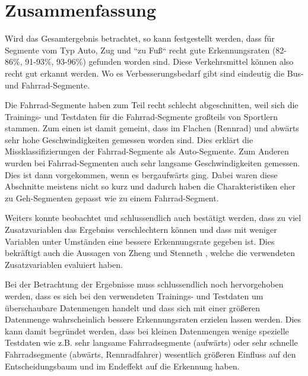 \section{Zusammenfassung}
Wird das Gesamtergebnis betrachtet, so kann festgestellt werden, dass für Segmente vom Typ Auto, Zug und ``zu Fuß`` recht gute Erkennungsraten (82-86\%, 91-93\%, 93-96\%) gefunden worden sind. Diese Verkehrsmittel können also recht gut erkannt werden. Wo es Verbesserungsbedarf gibt sind eindeutig die Bus- und Fahrrad-Segmente.  

Die Fahrrad-Segmente haben zum Teil recht schlecht abgeschnitten, weil sich die Trainings- und Testdaten für die Fahrrad-Segmente großteils von Sportlern stammen. Zum einen ist damit gemeint, dass im Flachen (Rennrad) und abwärts sehr hohe Geschwindigkeiten gemessen worden sind. Dies erklärt die Missklassifizierungen der Fahrrad-Segmente als Auto-Segmente. Zum Anderen wurden bei Fahrrad-Segmenten auch sehr langsame Geschwindigkeiten gemessen. Dies ist dann vorgekommen, wenn es bergaufwärts ging. Dabei waren diese Abschnitte meistens nicht so kurz und dadurch haben die Charakteristiken eher zu Geh-Segmenten gepasst wie zu einem Fahrrad-Segment.

Weiters konnte beobachtet und schlussendlich auch bestätigt werden, dass zu viel Zusatzvariablen das Ergebniss verschlechtern können und dass mit weniger Variablen unter Umständen eine bessere Erkennungsrate gegeben ist. Dies bekräftigt auch die Aussagen von Zheng \cite{zheng_understanding_2010} und Stenneth \cite{stenneth_transportation_2011}, welche die verwendeten Zusatzvariablen evaluiert haben. 

Bei der Betrachtung der Ergebnisse muss schlussendlich noch hervorgehoben werden, dass es sich bei den verwendeten Trainings- und Testdaten um überschaubare Datenmengen handelt und dass sich mit einer größeren Datenmenge wahrscheinlich bessere Erkennungsraten erzielen lassen werden. Dies kann damit begründet werden, dass bei kleinen Datenmengen wenige spezielle Testdaten wie z.B. sehr langsame Fahrradsegmente (aufwärts) oder sehr schnelle Fahrradsegmente (abwärts, Rennradfahrer) wesentlich größeren Einfluss auf den Entscheidungsbaum und im Endeffekt auf die Erkennung haben. 